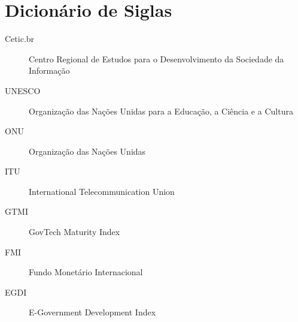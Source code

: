 \section*{Dicionário de Siglas}

\begin{description}
    \item[Cetic.br] Centro Regional de Estudos para o Desenvolvimento da Sociedade da Informação 
    \item[UNESCO] Organização das Nações Unidas para a Educação, a Ciência e a Cultura
    \item[ONU] Organização das Nações Unidas
    \item[ITU] International Telecommunication Union
    \item[GTMI] GovTech Maturity Index
    \item[FMI] Fundo Monetário Internacional
    \item[EGDI] E-Government Development Index
\end{description}